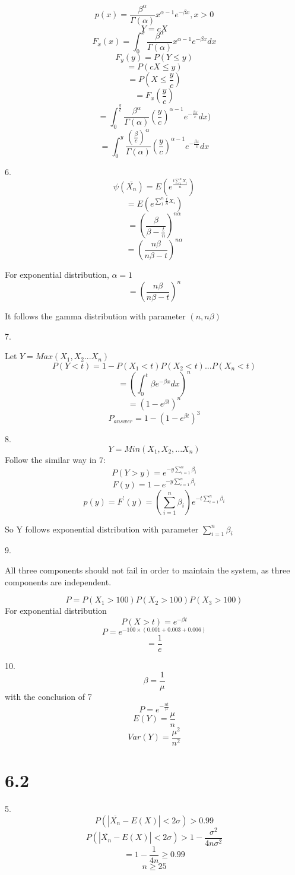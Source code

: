 \documentclass[12pt, a4paper, twocolumn]{article}
\begin{document}
$$p(x) = \frac{\beta^\alpha}{\Gamma(\alpha)}x^{\alpha - 1}e^{-\beta x}, x > 0$$
$$Y = cX$$
$$F_x(x) = \int_{0}^x\frac{\beta^\alpha}{\Gamma(\alpha)}x^{\alpha - 1}e^{-\beta x}dx$$
$$F_y(y) = P(Y \leqslant y)$$
$$ = P(cX \leqslant y)$$
$$ = P(X \leqslant \frac{y}{c})$$
$$ = F_x(\frac{y}{c})$$
$$ = \int_{0}^{\frac{y}{c}}\frac{\beta^\alpha}{\Gamma(\alpha)}(\frac{y}{c})^{\alpha - 1}e^{-\frac{\beta x}{c}}dx)$$
$$ = \int_{0}^{y}\frac{(\frac{\beta}{c})^\alpha}{\Gamma(\alpha)}(\frac{y}{c})^{\alpha - 1}e^{-\frac{\beta x}{c}}dx$$

6.
$$\psi(\bar{X_n}) = E(e^\frac{t\sum_1^n X_i}{n})$$
$$=E(e^{\sum_1^n\frac{t}{n}X_i})$$
$$=(\frac{\beta}{\beta - \frac{t}{n}})^{n\alpha}$$
$$=(\frac{n\beta}{n\beta - t})^{n\alpha}$$

For exponential distribution, $\alpha = 1$
$$=(\frac{n\beta}{n\beta - t})^n$$

It follows the gamma distribution with parameter $(n, n\beta)$


7.

Let $Y = Max(X_1, X_2 ... X_n)$ 
$$P(Y < t) = 1 - P(X_1 < t)P(X_2 < t)...P(X_n < t)$$
$$ = (\int_0^t \beta e^{-\beta x}dx)^n$$
$$ = (1 - e^{\beta t}) ^ n $$
$$ P_{answer} = 1 - (1 - e^{\beta t})^3$$

8.
$$Y = Min(X_1, X_2, ... X_n)$$
Follow the similar way in 7:
$$P(Y > y) = e^{-y\sum_{i = 1}^n\beta_i}$$
$$F(y) =  1 - e^{-y\sum_{i = 1}^n\beta_i}$$
$$p(y) = F^{'}(y) = (\sum_{i = 1}^n\beta_i) e^{-t\sum_{i = 1}^n\beta_i}$$

So Y follows exponential distribution with parameter $\sum_{i = 1}^n \beta_i$

9.

All three components should not fail in order to maintain the system, as three components are independent.

$$P = P(X_1 > 100)P(X_2 > 100)P(X_3 > 100)$$
For exponential distribution
$$P(X > t) = e^{-\beta t}$$
$$P = e^{-100\times(0.001 + 0.003 + 0.006)}$$
$$ = \frac{1}{e}$$

10.
$$\beta = \frac{1}{\mu}$$
with the conclusion of 7
$$P = e^{-\frac{nt}{\mu}}$$
$$E(Y) = \frac{\mu}{n}$$
$$Var(Y) = \frac{\mu^2}{n^2}$$

\section*{6.2}
5.
$$P(|\overline{X_n} - E(X)| < 2\sigma) > 0.99 $$
$$P(|\overline{X_n} - E(X)| < 2\sigma) > 1 - \frac{\sigma^2}{4n\sigma^2} $$
$$= 1 - \frac{1}{4n} \geqslant 0.99$$
$$n \geqslant 25$$
\end{document}

